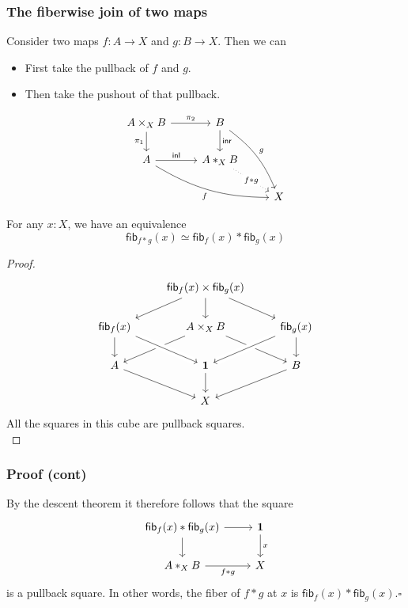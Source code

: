 \documentclass[handout]{beamer}
\newcommand{\unit}{\mathbf{1}}
\newcommand{\inr}{\mathsf{inr}}
\newcommand{\inl}{\mathsf{inl}}
\newcommand{\fib}{\mathsf{fib}}
\begin{document}
\begin{frame}
  \frametitle{The fiberwise join of two maps}
  Consider two maps $f:A\to X$ and $g:B\to X$. Then we can
  \begin{itemize}
  \item First take the pullback of $f$ and $g$.
  \item Then take the pushout of that pullback.
  \end{itemize}

  \begin{equation*}
    \begin{tikzcd}[ampersand replacement=\&]
      A\times_X B \arrow[d,swap,"\pi_1"] \arrow[r,"\pi_2"] \& B \arrow[d,"\inr"] \arrow[ddr,bend left=15,"g"] \\
      A \arrow[r,"\inl"] \arrow[drr,bend right=15,swap,"f"] \& A\ast_X B \arrow[dr,dotted,"f\ast g" description] \\
      \& \& X
    \end{tikzcd}
  \end{equation*}
\end{frame}

\begin{frame}
  \begin{theorem}
    For any $x:X$, we have an equivalence
    \begin{equation*}
      \fib_{f\ast g}(x)\simeq \fib_f(x)\ast\fib_g(x)
    \end{equation*}
  \end{theorem}

  \begin{proof}
  \begin{equation*}
    \begin{tikzcd}[ampersand replacement=\&]
      \& \fib_f(x)\times\fib_g(x) \arrow[dl] \arrow[dr] \arrow[d] \\
      \fib_f(x) \arrow[d] \& A\times_X B \arrow[dl] \arrow[dr] \& \fib_g(x) \arrow[dl,crossing over] \arrow[d] \\
      A \arrow[dr] \& \unit \arrow[from=ul,crossing over] \arrow[d] \& B \arrow[dl] \\
      \& X
    \end{tikzcd}
  \end{equation*}
  All the squares in this cube are pullback squares.\\[10em]    
  \end{proof}
\end{frame}

\begin{frame}
  \frametitle{Proof (cont)}
  By the descent theorem it therefore follows that the square
  \begin{equation*}
    \begin{tikzcd}[ampersand replacement=\&]
      \fib_f(x)\ast\fib_g(x) \arrow[d] \arrow[r] \& \unit \arrow[d,"x"] \\
      A\ast_X B \arrow[r,swap,"f\ast g"] \& X
    \end{tikzcd}
  \end{equation*}
  is a pullback square. In other words, the fiber of $f\ast g$ at $x$ is $\fib_f(x)\ast\fib_g(x)$.\hfill$\square$
\end{frame}
\end{document}
